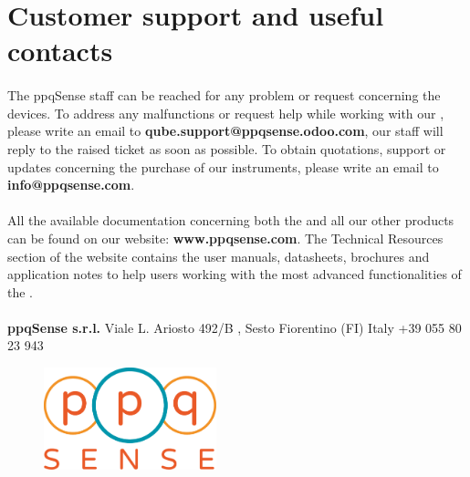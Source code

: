 \section{Customer support and useful contacts}

\paragraph{} The ppqSense staff can be reached for any problem or request concerning the \QubeModel  devices.
\newline To address any malfunctions or request help while working with our \QubeModel , please write an email to \textbf{qube.support@ppqsense.odoo.com}, our staff will reply to the raised ticket as soon as possible.
\newline To obtain quotations, support or updates concerning the purchase of our instruments, please write an email to \textbf{info@ppqsense.com}.

\paragraph{} All the available documentation concerning both the \QubeModel  and all our other products can be found on our website: \textbf{www.ppqsense.com}.
\newline The Technical Resources section of the website contains the user manuals, datasheets, brochures and application notes to help users working with the most advanced functionalities of the \QubeModel .

\paragraph{} \textbf{ppqSense s.r.l.} \newline Viale L. Ariosto 492/B , Sesto Fiorentino (FI) \newline Italy \newline +39 055 80 23 943

\begin{figure}[h]
    \centering
    \includegraphics[width=5cm]{images/ppqSense_Logo.pdf}
    \label{logo_ppqsense}
\end{figure}